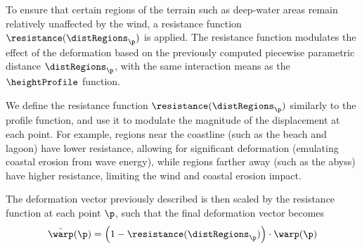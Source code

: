 To ensure that certain regions of the terrain such as deep-water areas remain relatively unaffected by the wind, a resistance function $\resistance(\distRegions_\p)$ is applied. The resistance function modulates the effect of the deformation based on the previously computed piecewise parametric distance $\distRegions_\p$, with the same interaction means as the $\heightProfile$ function.

We define the resistance function $\resistance(\distRegions_\p)$ similarly to the profile function, and use it to modulate the magnitude of the displacement at each point. For example, regions near the coastline (such as the beach and lagoon) have lower resistance, allowing for significant deformation (emulating coastal erosion from wave energy), while regions farther away (such as the abyss) have higher resistance, limiting the wind and coastal erosion impact.

The deformation vector previously described is then scaled by the resistance function at each point $\p$, such that the final deformation vector becomes
\begin{align}
    \Tilde{\warp}(\p) = \left(1 - \resistance(\distRegions_\p) \right) \cdot \warp(\p)
\end{align}

